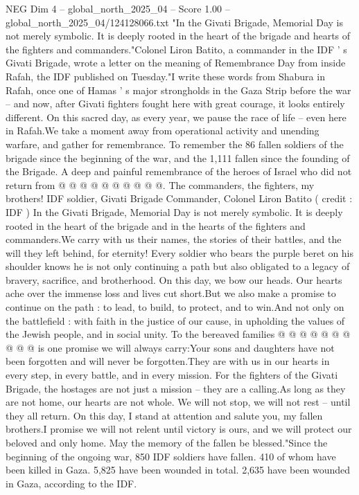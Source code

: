 \begin{textsample}{NEG Dim 4 – global\_north\_2025\_04 – Score 1.00 – global\_north\_2025\_04/124128066.txt}  \label{ex:f4_neg_238}
"In the Givati Brigade, Memorial Day is not merely symbolic.
It is deeply rooted in the heart of the brigade and hearts of the fighters and commanders."Colonel Liron Batito, a commander in the IDF ' s Givati Brigade, wrote a letter on the meaning of Remembrance Day from inside Rafah, the IDF published on Tuesday."I write these words from Shabura in Rafah, once one of Hamas ' s major strongholds in the Gaza Strip before the war -- and now, after Givati fighters fought here with great courage, it looks entirely different.
On this sacred day, as every year, we pause the race of life -- even here in Rafah.We take a moment away from operational activity and unending warfare, and gather for remembrance.
To remember the 86 fallen soldiers of the brigade since the beginning of the war, and the 1,111 fallen since the founding of the Brigade.
A deep and painful remembrance of the heroes of Israel who did not return from @ @ @ @ @ @ @ @ @ @.
The commanders, the fighters, my brothers!
IDF soldier, Givati Brigade Commander, Colonel Liron Batito ( credit : IDF ) In the Givati Brigade, Memorial Day is not merely symbolic.
It is deeply rooted in the heart of the brigade and in the hearts of the fighters and commanders.We carry with us their names, the stories of their battles, and the will they left behind, for eternity!
Every soldier who bears the purple beret on his shoulder knows he is not only continuing a path but also obligated to a legacy of bravery, sacrifice, and brotherhood.
On this day, we bow our heads.
Our hearts ache over the immense loss and lives cut short.But we also make a promise to continue on the path : to lead, to build, to protect, and to win.And not only on the battlefield : with faith in the justice of our cause, in upholding the values of the Jewish people, and in social unity.
To the bereaved families @ @ @ @ @ @ @ @ @ @ is one promise we will always carry:Your sons and daughters have not been forgotten and will never be forgotten.They are with us in our hearts in every step, in every battle, and in every mission.
For the fighters of the Givati Brigade, the hostages are not just a mission -- they are a calling.As long as they are not home, our hearts are not whole.
We will not stop, we will not rest -- until they all return.
On this day, I stand at attention and salute you, my fallen brothers.I promise we will not relent until victory is ours, and we will protect our beloved and only home.
May the memory of the fallen be blessed."Since the beginning of the ongoing war, 850 IDF soldiers have fallen. 410 of whom have been killed in Gaza. 5,825 have been wounded in total. 2,635 have been wounded in Gaza, according to the IDF.

\end{textsample}
